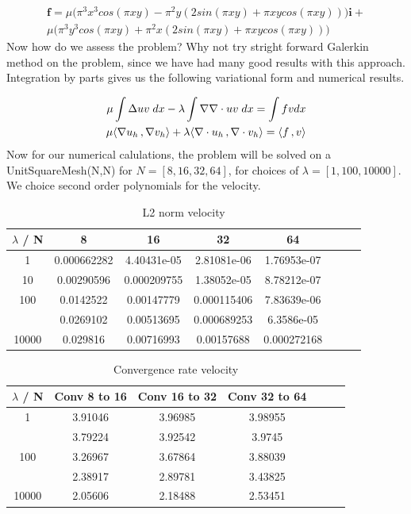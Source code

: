 \documentclass[a4paper,norsk]{article}
\begin{document}
\begin{align*}
\textbf{f} = \mu \big(\pi^3 x^3 cos(\pi x y) -\pi^2y (2sin(\pi x y) + \pi x y cos(\pi x y)   ) \big) \textbf{i} + \\
\mu \big( \pi^3y^3 cos(\pi x y) + \pi^2 x (2 sin(\pi x y) + \pi x y cos(\pi x y)   )  \big)
\end{align*}
Now how do we assess the problem? 
Why not try stright forward Galerkin method on the problem, since we have had many good results with this approach.
Integration by parts gives us the following variational form and numerical results.

\begin{align*}
\mu \int \Delta u v \hspace{1mm} dx - \lambda \int \nabla \nabla \cdot u v \hspace{1mm} dx = \int f v dx\\ 
\mu \langle \nabla u_h \,, \nabla v_h \rangle + \lambda \langle \nabla \cdot u_h \,, \nabla \cdot v_h \rangle 
= \langle f \,, v \rangle
\end{align*}
Now for our numerical calulations, the problem will be solved on a UnitSquareMesh(N,N) for $N = [8, 16, 32, 64]$, for 
choices of $\lambda = [1, 100, 10000]$. We choice second order polynomials for the velocity.  


\begin{table}[ht]
\caption {L2 norm velocity} 
\centering
\begin{tabular}{c|ccccccc}
\hline
\rowcolor{LightCyan}
$\lambda$ / N  & 8 & 16 & 32 & 64\\
\hline
 1     & 0.000662282 & 4.40431e-05 & 2.81081e-06 & 1.76953e-07 \\ \hline 
 \rowcolor{LightCyan} 
10    & 0.00290596  & 0.000209755 & 1.38052e-05 & 8.78212e-07 \\ \hline
100   & 0.0142522   & 0.00147779  & 0.000115406 & 7.83639e-06 \\ \hline
\rowcolor{LightCyan} \hline
1000  & 0.0269102   & 0.00513695  & 0.000689253 & 6.3586e-05  \\ \hline
10000 & 0.029816    & 0.00716993  & 0.00157688  & 0.000272168 \\
\hline
\end{tabular}
\end{table}

\begin{table}[ht]
\caption {Convergence rate velocity} 
\centering
\begin{tabular}{c|cccccc}
\hline
\rowcolor{LightCyan}
$\lambda$ / N  & Conv 8 to 16  &  Conv 16 to 32 &  Conv 32 to 64\\
\hline
1     & 3.91046 & 3.96985 & 3.98955 &  \\ \hline
\rowcolor{LightCyan} \hline
10    & 3.79224 & 3.92542 & 3.9745  &  \\ \hline
100   & 3.26967 & 3.67864 & 3.88039 &  \\ \hline
\rowcolor{LightCyan} \hline
1000  & 2.38917 & 2.89781 & 3.43825 &  \\ \hline
10000 & 2.05606 & 2.18488 & 2.53451 & \\
\hline
\end{tabular}
\end{table}
 
\end{document}
